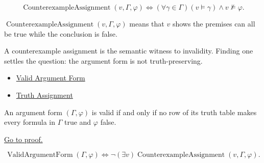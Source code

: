\begin{remark*}
\[
\operatorname{CounterexampleAssignment}(v,\Gamma,\varphi)
\Longleftrightarrow
(\forall\gamma\in\Gamma)(v\models\gamma)\land v\not\models\varphi.
\]
\end{remark*}

\begin{remark*}
\(\operatorname{CounterexampleAssignment}(v,\Gamma,\varphi)\) means that \(v\)
shows the premises can all be true while the conclusion is false.
\end{remark*}

\begin{remark*}[Interpretation]
A counterexample assignment is the semantic witness to invalidity. Finding one
settles the question: the argument form is not truth-preserving.
\end{remark*}

\begin{dependencies}
\begin{itemize}
  \item \hyperref[def:valid-argument-form-propositional-logic]{Valid Argument Form}
  \item \hyperref[def:truth-assignment-propositional-logic]{Truth Assignment}
\end{itemize}
\end{dependencies}

\begin{tcolorbox}[colback=thmbox, colframe=thmborder, arc=2pt,
  left=6pt, right=6pt, top=4pt, bottom=4pt,
  title={\small\textbf{Theorem (Truth-Table Validity Test for Argument Forms)}},
  fonttitle=\small\bfseries]
\begin{theorem}
\label{thm:truth-table-validity-test-argument-forms-propositional-logic}
An argument form \((\Gamma,\varphi)\) is valid if and only if no row of its truth
table makes every formula in \(\Gamma\) true and \(\varphi\) false.

\noindent\hyperref[prf:truth-table-validity-test-argument-forms-propositional-logic]{Go to proof.}
\end{theorem}
\end{tcolorbox}

\begin{remark*}
\[
\operatorname{ValidArgumentForm}(\Gamma,\varphi)
\Longleftrightarrow
\neg(\exists v)\operatorname{CounterexampleAssignment}(v,\Gamma,\varphi).
\]
\end{remark*}

